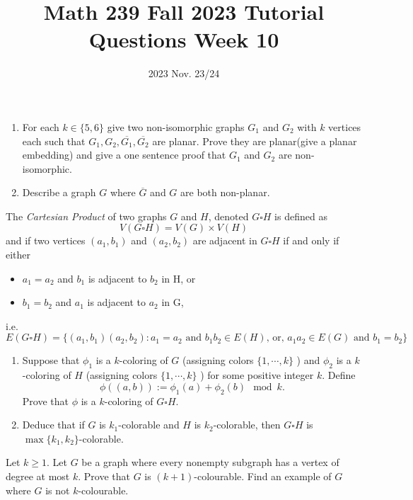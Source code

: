 \title{Math 239 Fall 2023 Tutorial Questions Week 10}

\date{2023 Nov. 23/24}
\maketitle

\begin{enumerate}
    \begin{enumerate}
        \item  For each $k\in\{ 5,6\}$ give two non-isomorphic graphs $G_1$ and $G_2$ with $k$ vertices each such that $G_1, G_2, \overline{G_1}, \overline{G_2}$ are planar. Prove they are planar(give a planar embedding) and give a one sentence proof that $G_1$ and $G_2$ are non-isomorphic. 
        \item Describe a graph $G$ where $\overline{G}$ and $G$ are both non-planar. 
     \end{enumerate}
    
     The \textit{Cartesian Product} of two graphs $G$ and $H$, denoted $G\square H$ is defined as 
    \[V(G\square H) = V(G) \times V(H)\]
    and if two vertices $(a_1, b_1)$ and $(a_2, b_2)$ are adjacent in $G \square H$ if and only if either 
    \begin{itemize}
        \item $a_1 = a_2$ and $b_1$ is adjacent to $b_2$ in H, or
        \item $b_1 = b_2$ and $a_1$ is adjacent to $a_2$ in G, 
    \end{itemize}
i.e.
    \[E(G\square H) = \{(a_1,b_1)(a_2,b_2): a_1 = a_2 \text{ and } b_1b_2\in E(H)\text{, or, }a_1a_2 \in E(G) \text{ and } b_1 = b_2\}\]
    \begin{enumerate}
        \item Suppose that $\phi_1$ is a $k$-coloring of $G$ (assigning colors $\{1,\cdots,k\}$ ) and  $\phi_2$ is a $k$-coloring of $H$ (assigning colors $\{1,\cdots,k\}$ ) for some positive integer $k$. Define\[\phi((a,b)) := \phi_1(a) + \phi_2(b)\mod{k}.\]
        Prove that $\phi$ is a $k$-coloring of $G\square H$.
        \item Deduce that if $G$ is $k_1$-colorable and $H$ is $k_2$-colorable, then $G\square H$ is $\max \{k_1, k_2\}$-colorable.
    \end{enumerate}

    
     Let $k \ge 1$. Let $G$ be a graph where every nonempty subgraph has a vertex of degree at most $k$. Prove that $G$ is $(k + 1)$-colourable. Find an example of $G$ where $G$ is not $k$-colourable.


\end{enumerate}
